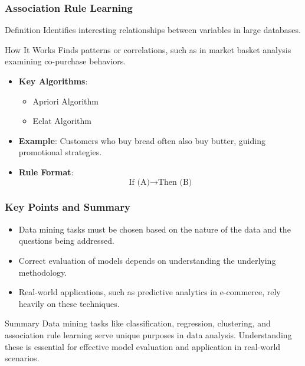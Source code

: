 \documentclass[aspectratio=169]{beamer}
\begin{document}
\begin{frame}[fragile]
    \frametitle{Association Rule Learning}
    \begin{block}{Definition}
        Identifies interesting relationships between variables in large databases.
    \end{block}
    \begin{block}{How It Works}
        Finds patterns or correlations, such as in market basket analysis examining co-purchase behaviors.
    \end{block}
    \begin{itemize}
        \item \textbf{Key Algorithms}:
        \begin{itemize}
            \item Apriori Algorithm
            \item Eclat Algorithm
        \end{itemize}
        \item \textbf{Example}: Customers who buy bread often also buy butter, guiding promotional strategies.
        \item \textbf{Rule Format}:
        \begin{equation}
            \text{If (A)} \rightarrow \text{Then (B)}
        \end{equation}
    \end{itemize}
\end{frame}

\begin{frame}[fragile]
    \frametitle{Key Points and Summary}
    \begin{itemize}
        \item Data mining tasks must be chosen based on the nature of the data and the questions being addressed.
        \item Correct evaluation of models depends on understanding the underlying methodology.
        \item Real-world applications, such as predictive analytics in e-commerce, rely heavily on these techniques.
    \end{itemize}
    
    \begin{block}{Summary}
        Data mining tasks like classification, regression, clustering, and association rule learning serve unique purposes in data analysis. Understanding these is essential for effective model evaluation and application in real-world scenarios.
    \end{block}
\end{frame}
\end{document}
